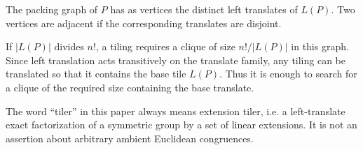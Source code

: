 \begin{definition}
The packing graph of $P$ has as vertices the distinct left translates of
$L(P)$.  Two vertices are adjacent if the corresponding translates are
disjoint.
\end{definition}

If $|L(P)|$ divides $n!$, a tiling requires a clique of size
$n!/|L(P)|$ in this graph.  Since left translation acts transitively on
the translate family, any tiling can be translated so that it contains the
base tile $L(P)$.  Thus it is enough to search for a clique of the
required size containing the base translate.

\begin{remark}
The word ``tiler'' in this paper always means extension tiler, i.e. a
left-translate exact factorization of a symmetric group by a set of
linear extensions.  It is not an assertion about arbitrary ambient
Euclidean congruences.
\end{remark}
